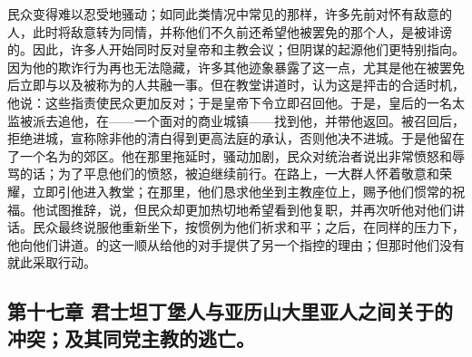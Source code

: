 民众变得难以忍受地骚动；如同此类情况中常见的那样，许多先前对怀有敌意的人，此时将敌意转为同情，并称他们不久前还希望他被罢免的那个人，是被诽谤的。因此，许多人开始同时反对皇帝和主教会议；但阴谋的起源他们更特别指向。因为他的欺诈行为再也无法隐藏，许多其他迹象暴露了这一点，尤其是他在被罢免后立即与以及被称为的人共融一事。但在教堂讲道时，认为这是抨击的合适时机，他说：这些指责使民众更加反对；于是皇帝下令立即召回他。于是，皇后的一名太监被派去追他，在——一个面对的商业城镇——找到他，并带他返回。被召回后，拒绝进城，宣称除非他的清白得到更高法庭的承认，否则他决不进城。于是他留在了一个名为的郊区。他在那里拖延时，骚动加剧，民众对统治者说出非常愤怒和辱骂的话；为了平息他们的愤怒，被迫继续前行。在路上，一大群人怀着敬意和荣耀，立即引他进入教堂；在那里，他们恳求他坐到主教座位上，赐予他们惯常的祝福。他试图推辞，说，但民众却更加热切地希望看到他复职，并再次听他对他们讲话。民众最终说服他重新坐下，按惯例为他们祈求和平；之后，在同样的压力下，他向他们讲道。的这一顺从给他的对手提供了另一个指控的理由；但那时他们没有就此采取行动。\par


\subsection{第十七章 君士坦丁堡人与亚历山大里亚人之间关于的冲突；及其同党主教的逃亡。}


